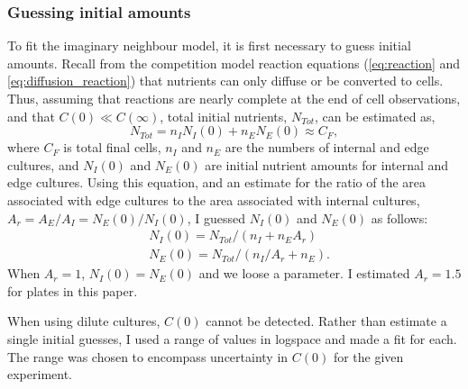 
\subsubsection{Guessing initial amounts}
\label{sec:guessing_amounts}

To fit the imaginary neighbour model, it is first necessary to guess
initial amounts. Recall from the competition model reaction equations
(\ref{eq:reaction} and \ref{eq:diffusion_reaction}) that nutrients can
only diffuse or be converted to cells. Thus, assuming that reactions
are nearly complete at the end of cell observations, and that
\(C(0) \ll C(\infty)\), total initial nutrients, \(N_{Tot}\), can be
estimated as,
\begin{equation}
  \label{eq:N_Tot}
  N_{Tot} = n_{I}N_{I}(0) + n_{E}N_{E}(0) \approx C_{F},
\end{equation}
where \(C_{F}\) is total final cells, \(n_{I}\) and \(n_{E}\) are the
numbers of internal and edge cultures, and \(N_{I}(0)\) and
\(N_{E}(0)\) are initial nutrient amounts for internal and edge
cultures. Using this equation, and an estimate for the ratio of the
area associated with edge cultures to the area associated with
internal cultures, \(A_{r} = A_{E} / A_{I} = N_{E}(0) / N_{I}(0)\), I
guessed \(N_{I}(0)\) and \(N_{E}(0)\) as follows:
%
\begin{equation}
  \label{eq:N_0_guesses}
  \begin{aligned}
    &N_{I}(0) = N_{Tot} / (n_{I} + n_{E}A_{r})\\
    &N_{E}(0) = N_{Tot} / (n_{I}/A_{r} + n_{E}).
  \end{aligned}
\end{equation}
%
When \(A_{r} = 1\), \(N_{I}(0) = N_{E}(0)\) and we loose a
parameter. I estimated \(A_{r} = 1.5\) for plates in this paper.

When using dilute cultures, \(C(0)\) cannot be detected. Rather than
estimate a single initial guesses, I used a range of values in
logspace and made a fit for each. The range was chosen to encompass
uncertainty in \(C(0)\) for the given experiment.


